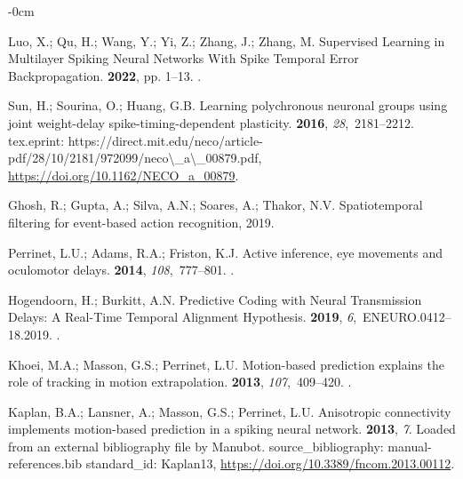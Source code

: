 \documentclass[brainsci, %
               review,submit,pdftex,moreauthors
               ]{Definitions/mdpi}
\begin{document}
\begin{adjustwidth}{-\extralength}{0cm}
\begin{thebibliography}{999}
  Luo, X.; Qu, H.; Wang, Y.; Yi, Z.; Zhang, J.; Zhang, M.
  \newblock Supervised {Learning} in {Multilayer} {Spiking} {Neural} {Networks}
    {With} {Spike} {Temporal} {Error} {Backpropagation}.
   {\bf
    2022}, pp. 1--13.
  .
  
  Sun, H.; Sourina, O.; Huang, G.B.
  \newblock Learning polychronous neuronal groups using joint weight-delay
    spike-timing-dependent plasticity.
   {\bf 2016}, {\em 28},~2181--2212.
  \newblock tex.eprint:
    https://direct.mit.edu/neco/article-pdf/28/10/2181/972099/neco{\textbackslash}\_a{\textbackslash}\_00879.pdf,
    {\url{https://doi.org/10.1162/NECO_a_00879}}.
  
  Ghosh, R.; Gupta, A.; Silva, A.N.; Soares, A.; Thakor, N.V.
  \newblock Spatiotemporal filtering for event-based action recognition,  2019.
  
  Perrinet, L.U.; Adams, R.A.; Friston, K.J.
  \newblock Active inference, eye movements and oculomotor delays.
   {\bf 2014}, {\em 108},~777--801.
  .
  
  Hogendoorn, H.; Burkitt, A.N.
  \newblock Predictive {Coding} with {Neural} {Transmission} {Delays}: {A}
    {Real}-{Time} {Temporal} {Alignment} {Hypothesis}.
   {\bf 2019}, {\em 6},~ENEURO.0412--18.2019.
  .
  
  Khoei, M.A.; Masson, G.S.; Perrinet, L.U.
  \newblock Motion-based prediction explains the role of tracking in motion
    extrapolation.
   {\bf 2013}, {\em 107},~409--420.
  .
  
  Kaplan, B.A.; Lansner, A.; Masson, G.S.; Perrinet, L.U.
  \newblock Anisotropic connectivity implements motion-based prediction in a
    spiking neural network.
   {\bf 2013}, {\em 7}.
  \newblock Loaded from an external bibliography file by Manubot.
    source\_bibliography: manual-references.bib standard\_id: Kaplan13,
    {\url{https://doi.org/10.3389/fncom.2013.00112}}.
  

\end{thebibliography}
\end{adjustwidth}
\end{document}
